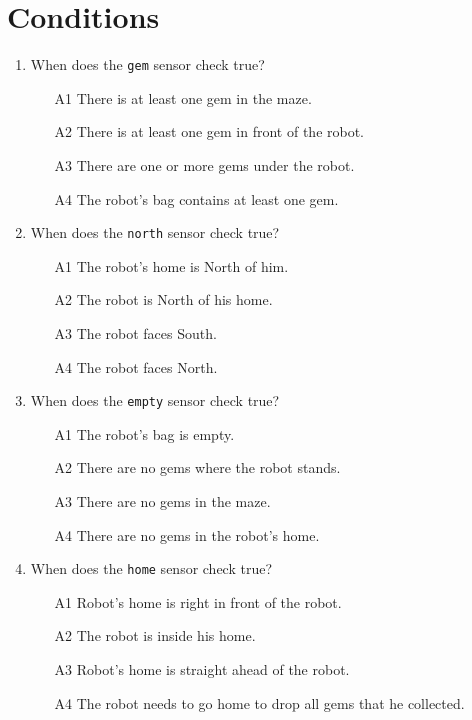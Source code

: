 
\section{Conditions}

\begin{enumerate}
\item When does the {\tt gem} sensor check true?
\begin{enumerate}
\item[A1] There is at least one gem in the maze.
\item[A2] There is at least one gem in front of the robot.
\item[A3] There are one or more gems under the robot.
\item[A4] The robot's bag contains at least one gem.
\end{enumerate}
\item When does the {\tt north} sensor check true?
\begin{enumerate}
\item[A1] The robot's home is North of him.
\item[A2] The robot is North of his home.
\item[A3] The robot faces South.
\item[A4] The robot faces North.
\end{enumerate}
\item When does the {\tt empty} sensor check true?
\begin{enumerate}
\item[A1] The robot's bag is empty.
\item[A2] There are no gems where the robot stands.
\item[A3] There are no gems in the maze.
\item[A4] There are no gems in the robot's home.
\end{enumerate}
\item When does the {\tt home} sensor check true?
\begin{enumerate}
\item[A1] Robot's home is right in front of the robot.
\item[A2] The robot is inside his home.
\item[A3] Robot's home is straight ahead of the robot.
\item[A4] The robot needs to go home to drop all gems that he collected.
\end{enumerate}

\end{enumerate}
